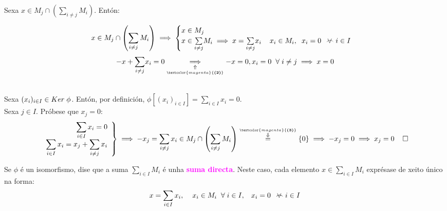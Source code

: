 \documentclass[twoside]{report}
\newcommand{\magbf}[1]{\textcolor{magenta}{\textbf{#1}}} %
\newcommand{\almostall}{\mathrel{\vee\mkern-19mu\frown}} %
\theoremstyle{mystyle}
\begin{document}
\noindent Sexa $x \in M_{j} \cap \left(\displaystyle \sum_{i \neq j} M_{i}\right)$. Entón:

$$
x \in M_{j} \cap \left(\displaystyle \sum_{i \neq j} M_{i}\right) \implies 
\begin{cases}
x \in M_{j}\\
x \in \underset{i \neq j}{\sum} M_{i} \implies x = \underset{i \neq j}{\sum}x_{i} \hspace{4mm} x_{i} \in M_{i}, \hspace{2mm} x_{i} = 0 \hspace{2mm} \almostall i \in I
\end{cases}
$$
\vspace{2mm}
$$
-x + \underset{i \neq j}{\sum}x_{i} = 0 \underset{\underset{\magbf{(2)}}{\Uparrow}}{\implies} -x = 0, x_{i} = 0 \hspace{2mm} \forall \hspace{1mm} i \neq j \implies x = 0
$$

\noindent {}\\

\noindent Sexa $(x_{i})_{i \in I} \in Ker \hspace{1mm} \phi$. Entón, por definición, $\phi[(x_{i})_{i \in I}] = \displaystyle \sum_{i \in I} x_{i} = 0$.\\

\noindent Sexa $j \in I$. Próbese que $x_{j} = 0$:
    \[ 
    \left. \begin{array}{r} 
    \displaystyle \sum_{i \in I} x_{i} = 0 \\[1ex]
    \displaystyle \sum_{i \in I} x_{i} = x_{j} + \displaystyle \sum_{i \neq j} x_{i}
    \end{array} \right\} 
    \implies -x_{j} = \displaystyle \sum_{i \neq j} x_{i} \in M_{j} \cap \left(\displaystyle \sum_{i \neq j} M_{i}\right) \overset{\overset{\magbf{(3)}}{\Downarrow}}{=} \{0\} \implies -x_{j} = 0 \implies x_{j} = 0 \hspace{4mm} \square
    \]
    
\vspace{3mm}

\noindent Se $\phi$ é un isomorfismo, dise que a suma $\displaystyle \sum_{i \in I} M_{i}$ é unha \magbf{suma directa}. Neste caso, cada elemento $x \in \underset{i \in I}{\sum}M_{i}$ exprésase de xeito único na forma:
$$x = \displaystyle \sum_{i \in I} x_{i}, \hspace{4mm} x_{i} \in M_{i} \hspace{2mm} \forall \hspace{1mm} i \in I, \hspace{3mm} x_{i} = 0 \hspace{2mm} \almostall i \in I$$
\end{document}
